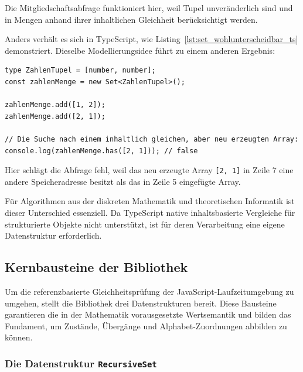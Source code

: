Die Mitgliedschaftsabfrage funktioniert hier, weil Tupel unveränderlich sind und in Mengen anhand ihrer inhaltlichen Gleichheit berücksichtigt werden.

Anders verhält es sich in TypeScript, wie Listing~\ref{lst:set_wohlunterscheidbar_ts} demonstriert. Dieselbe Modellierungsidee führt zu einem anderen Ergebnis:

\begin{listing}[ht]
    \caption{Mengenverhalten in TypeScript}
    \label{lst:set_wohlunterscheidbar_ts}
    \begin{verbatim}
type ZahlenTupel = [number, number];
const zahlenMenge = new Set<ZahlenTupel>();

zahlenMenge.add([1, 2]);
zahlenMenge.add([2, 1]);

// Die Suche nach einem inhaltlich gleichen, aber neu erzeugten Array:
console.log(zahlenMenge.has([2, 1])); // false
    \end{verbatim}
\end{listing}

Hier schlägt die Abfrage fehl, weil das neu erzeugte Array \texttt{[2, 1]} in Zeile 7 eine andere Speicheradresse besitzt als das in Zeile 5 eingefügte Array.

Für Algorithmen aus der diskreten Mathematik und theoretischen Informatik ist dieser Unterschied essenziell. Da TypeScript native inhaltsbasierte Vergleiche für strukturierte Objekte nicht unterstützt, ist für deren Verarbeitung eine eigene Datenstruktur erforderlich.

\subsection{Kernbausteine der Bibliothek}
\label{subsec:rs-api-kernbausteine}

Um die referenzbasierte Gleichheitsprüfung der JavaScript-Laufzeitumgebung zu umgehen, stellt die Bibliothek drei Datenstrukturen bereit. Diese Bausteine garantieren die in der Mathematik vorausgesetzte Wertsemantik und bilden das Fundament, um Zustände, Übergänge und Alphabet-Zuordnungen abbilden zu können.

\subsubsection{Die Datenstruktur \texttt{RecursiveSet}}
\label{subsubsec:rs-api-datenstruktur}

